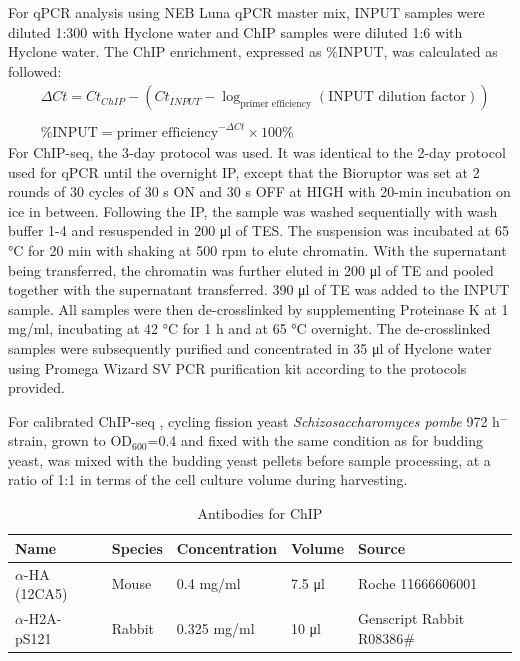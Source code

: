 For qPCR analysis using NEB Luna qPCR master mix, INPUT samples were diluted 1:300 with Hyclone water and ChIP samples were diluted 1:6 with Hyclone water. The ChIP enrichment, expressed as \%INPUT, was calculated as followed: 
\begin{align*}
    & \Delta Ct = Ct_{ChIP} - (Ct_{INPUT} - \log_{\text{primer efficiency}} (\text{{INPUT dilution factor}})) \\
    & \\
    & \text{\%INPUT} = \text{primer efficiency}^{-\Delta Ct} \times 100 \%
\end{align*}
For ChIP-seq, the 3-day protocol was used. It was identical to the 2-day protocol used for qPCR until the overnight IP, except that the Bioruptor was set at 2 rounds of 30 cycles of 30 \si{\second} ON and 30 \si{\second} OFF at HIGH with 20-min incubation on ice in between. Following the IP, the sample was washed sequentially with wash buffer 1-4 and resuspended in 200 \si{\micro\litre} of TES. The suspension was incubated at 65 \si{\celsius} for 20 \si{\minute} with shaking at 500 rpm to elute chromatin. With the supernatant being transferred, the chromatin was further eluted in 200 \si{\micro\litre} of TE and pooled together with the supernatant transferred. 390 \si{\micro\litre} of TE was added to the INPUT sample. All samples were then de-crosslinked by supplementing Proteinase K at 1 \si{\milli\gram/\milli\litre}, incubating at 42 \si{\celsius} for 1 \si{\hour} and at 65 \si{\celsius} overnight. The de-crosslinked samples were subsequently purified and concentrated in 35 \si{\micro\litre} of Hyclone water using Promega Wizard SV PCR purification kit according to the protocols provided. 

For calibrated ChIP-seq \citep{Hu2015BiologicalChIP-seq}, cycling fission yeast \textit{Schizosaccharomyces pombe} 972 h$^{-}$ strain, grown to OD$_{600}$=0.4 and fixed with the same condition as for budding yeast, was mixed with the budding yeast pellets before sample processing, at a ratio of 1:1 in terms of the cell culture volume during harvesting. 

\begin{table}[htbp]
\centering
\caption{Antibodies for ChIP}
\label{tab:abChIP}
\begin{tabular}{lllll}
\hline
\textbf{Name} & \textbf{Species} & \textbf{Concentration} & \textbf{Volume} & \textbf{Source} \\ \hline
$\alpha$-HA (12CA5) & Mouse & 0.4 \si{\milli\gram/\milli\litre} & 7.5 \si{\micro\litre} & Roche 11666606001 \\   
$\alpha$-H2A-pS121 & Rabbit & 0.325 \si{\milli\gram/\milli\litre} & 10 \si{\micro\litre} & Genscript Rabbit R08386\# \\
\end{tabular}
\end{table}

